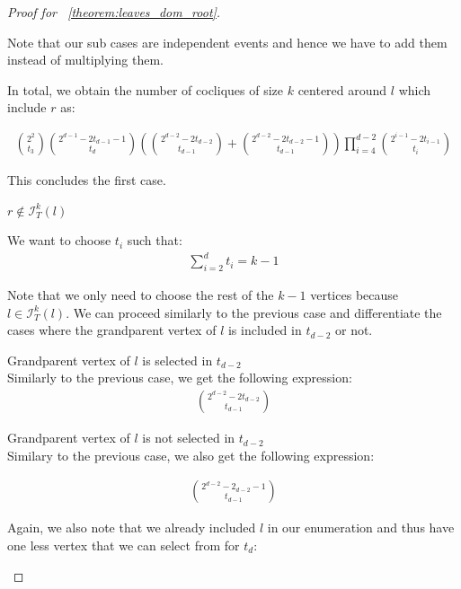 \documentclass{amsart}
\theoremstyle{definition}
\begin{document}
\begin{proof}[Proof for ~\ref{theorem:leaves_dom_root}]
\begin{caseof}
		Note that our sub cases are independent events and hence we have to add them instead of multiplying them.

		In total, we obtain the number of cocliques of size $k$ centered around $l$ which include $r$ as:

		\begin{align}
			\binom{2^2}{t_3}\binom{2^{d - 1} - 2t_{d - 1} - 1}{t_d}\left(\binom{2^{d - 2} - 2t_{d - 2}}{t_{d - 1}} + \binom{2^{d - 2} - 2t_{d - 2} - 1}{t_{d - 1}}\right)\displaystyle\prod_{i = 4}^{d - 2}\binom{2^{i - 1} - 2t_{i - 1}}{t_i}\label{eq:leaf_star_card_1}
		\end{align}

		This concludes the first case.

		\item $r \not\in \mathcal{I}^k_T(l)$

		We want to choose $t_i$ such that:
		\begin{align*}
			\displaystyle\sum_{i = 2}^{d}t_i = k - 1
		\end{align*}

		Note that we only need to choose the rest of the $k - 1$ vertices because $l \in \mathcal{I}^k_T(l)$. We can proceed similarly to the previous case and differentiate the cases where the grandparent vertex of $l$ is included in $t_{d - 2}$ or not.

		\begin{subcaseof}
			\item Grandparent vertex of $l$ is selected in $t_{d - 2}$\\
			Similarly to the previous case, we get the following expression:
			\begin{align*}
				\binom{2^{d - 2} - 2t_{d - 2}}{t_{d - 1}}
			\end{align*}


			\item Grandparent vertex of $l$ is not selected in $t_{d - 2}$\\
			Similary to the previous case, we also get the following expression:

			\begin{align*}
				\binom{2^{d - 2} - 2_{d - 2} - 1}{t_{d - 1}}
			\end{align*}

		\end{subcaseof}

		Again, we also note that we already included $l$ in our enumeration and thus have one less vertex that we can select from for $t_d$:


\end{caseof}
\end{proof}
\end{document}
